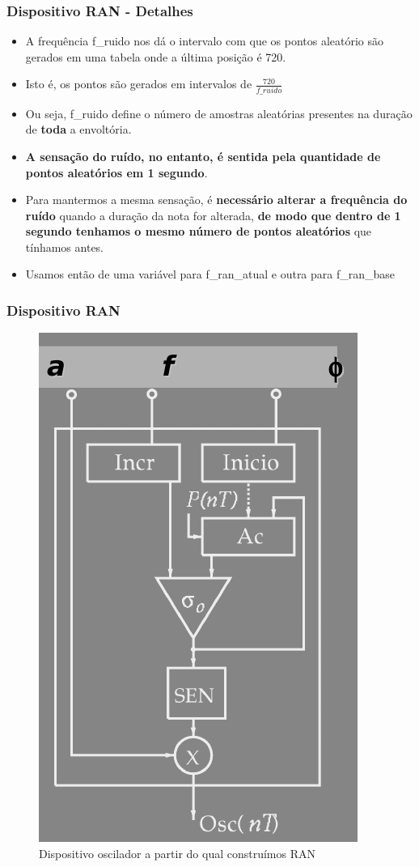 \documentclass{beamer}
\begin{document}
\begin{frame}
 \frametitle{Dispositivo RAN - Detalhes}
 \begin{itemize}
 	\item A frequência f\_ruido nos dá o intervalo com que os pontos aleatório são gerados
 	em uma tabela onde a última posição é 720.
 	\item Isto é, os pontos são gerados em intervalos de $\frac{720}{f\_ruido}$
 	\item Ou seja, f\_ruido define o número de amostras aleatórias presentes na duração
 	de \textbf{toda} a envoltória.
 	\item \textbf{A sensação do ruído, no entanto, é sentida pela quantidade de pontos aleatórios em 1 segundo}.
 	\item Para mantermos a mesma sensação, é\textbf{ necessário alterar a frequência do ruído} quando a duração da nota for alterada, \textbf{de modo que dentro de 1 segundo tenhamos o mesmo
 	número de pontos aleatórios} que tínhamos antes.
 	\item Usamos então de uma variável para f\_ran\_atual e outra para f\_ran\_base
 \end{itemize}
\end{frame}

\begin{frame}
 \frametitle{Dispositivo RAN}
 \begin{figure}
  \includegraphics[scale=0.3]{./images/oscilador.png}
  \caption{Dispositivo oscilador a partir do qual construímos RAN}
   \end{figure}
\end{frame}
\end{document}
